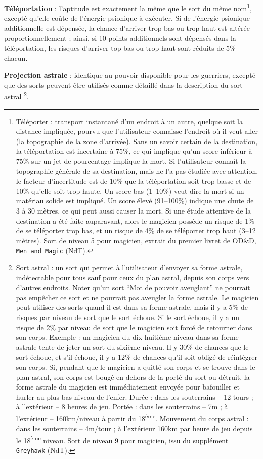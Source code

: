 \documentclass[11pt]{article}
\begin{document}
{\textbf{Téléportation} : l'aptitude est exactement la même que le sort du même nom\footnote{
\og Téléporter : transport instantané d'un endroit à un autre, quelque soit la distance impliquée, pourvu que l'utilisateur connaisse l'endroit où il veut aller (la topographie de la zone d'arrivée). Sans un savoir certain de la destination, la téléportation est incertaine à 75\%, ce qui implique qu'un score inférieur à 75\% sur un jet de pourcentage implique la mort. Si l'utilisateur connaît la topographie générale de sa destination, mais ne l'a pas étudiée avec attention, le facteur d'incertitude est de 10\% que la téléportation soit trop basse et de 10\% qu'elle soit trop haute. Un score bas (1--10\%) veut dire la mort si un matériau solide est impliqué. Un score élevé (91--100\%) indique une chute de 3 à 30 mètres, ce qui peut aussi causer la mort. Si une étude attentive de la destination a été faite auparavant, alors le magicien possède un risque de 1\% de se téléporter trop bas, et un risque de 4\% de se téléporter trop haut (3--12 mètres). \fg{} Sort de niveau 5 pour magicien, extrait du premier livret de OD\&D, \texttt{Men and Magic} (NdT).
}, excepté qu'elle coûte de l'énergie psionique à exécuter. Si de l'énergie psionique additionnelle est dépensée, la chance d'arriver trop bas ou trop haut est altérée proportionnellement ; ainsi, si 10 points additionnels sont dépensés dans la téléportation, les risques d'arriver top bas ou trop haut sont réduits de 5\% chacun.

\bigskip

\textbf{Projection astrale} : identique au pouvoir disponible pour les guerriers, excepté que des sorts peuvent être utilisés comme détaillé dans la description du \og sort astral \fg{}\footnote{
\og Sort astral : un sort qui permet à l'utilisateur d'envoyer sa forme astrale, indétectable pour tous sauf pour ceux du plan astral, depuis son corps vers d'autres endroits. Noter qu'un sort ``Mot de pouvoir aveuglant'' ne pourrait pas empêcher ce sort et ne pourrait pas aveugler la forme astrale. Le magicien peut utiliser des sorts quand il est dans sa forme astrale, mais il y a 5\% de risques par niveau de sort que le sort échoue. Si le sort échoue, il y a un risque de 2\% par niveau de sort que le magicien soit forcé de retourner dans son corps. Exemple : un magicien du dix-huitième niveau dans sa forme astrale tente de jeter un sort du sixième niveau. Il y  30\% de chances que le sort échoue, et s'il échoue, il y a 12\% de chances qu'il soit obligé de réintégrer son corps. Si, pendant que le magicien a quitté son corps et se trouve dans le plan astral, son corps est bougé en dehors de la porté du sort ou détruit, la forme astrale du magicien est immédiatement envoyée pour bafouiller et hurler au plus bas niveau de l'enfer. Durée : dans les souterrains -- 12 tours ; à l'extérieur -- 8 heures de jeu. Portée : dans les souterrains -- 7m ; à l'extérieur -- 160km/niveau à partir du 18\textsuperscript{ème}. Mouvement du corps astral : dans les souterrains -- 4m/tour ; à l'extérieur 160km par heure de jeu depuis le 18\textsuperscript{ème} niveau.\fg{} Sort de niveau 9 pour magicien, issu du supplément \texttt{Greyhawk} (NdT).
}.

}
\end{document}
